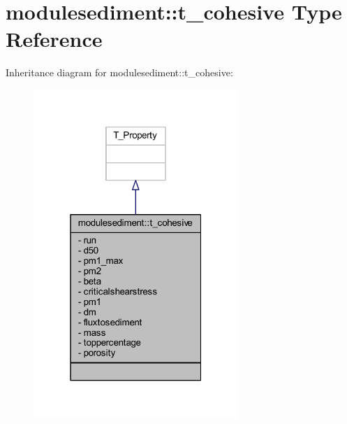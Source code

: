 \hypertarget{structmodulesediment_1_1t__cohesive}{}\section{modulesediment\+:\+:t\+\_\+cohesive Type Reference}
\label{structmodulesediment_1_1t__cohesive}


Inheritance diagram for modulesediment\+:\+:t\+\_\+cohesive\+:\nopagebreak
\begin{figure}[H]
\begin{center}
\leavevmode
\includegraphics[width=220pt]{structmodulesediment_1_1t__cohesive__inherit__graph}
\end{center}
\end{figure}


